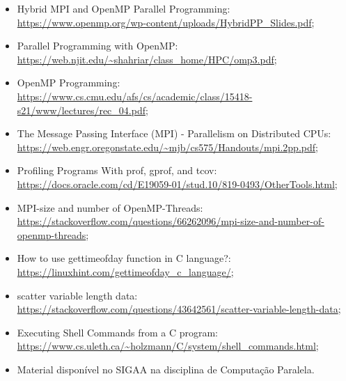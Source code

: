 \documentclass[a4paper, 12pt]{article}
\begin{document}
\begin{itemize}
    \item Hybrid MPI and OpenMP Parallel Programming: \url{https://www.openmp.org/wp-content/uploads/HybridPP_Slides.pdf};
    \item Parallel Programming with OpenMP: \url{https://web.njit.edu/~shahriar/class_home/HPC/omp3.pdf};
    \item OpenMP Programming: \url{https://www.cs.cmu.edu/afs/cs/academic/class/15418-s21/www/lectures/rec_04.pdf};
    \item The Message Passing Interface (MPI) - Parallelism on Distributed CPUs: \url{https://web.engr.oregonstate.edu/~mjb/cs575/Handouts/mpi.2pp.pdf};
    \item Profiling Programs With prof, gprof, and tcov: \url{https://docs.oracle.com/cd/E19059-01/stud.10/819-0493/OtherTools.html};
    \item MPI-size and number of OpenMP-Threads: \url{https://stackoverflow.com/questions/66262096/mpi-size-and-number-of-openmp-threads};
    \item How to use gettimeofday function in C language?: \url{https://linuxhint.com/gettimeofday_c_language/};
    \item scatter variable length data: \url{https://stackoverflow.com/questions/43642561/scatter-variable-length-data};
    \item Executing Shell Commands from a C program: \url{https://www.cs.uleth.ca/~holzmann/C/system/shell_commands.html};
    \item Material disponível no SIGAA na disciplina de Computação Paralela.
\end{itemize}
\end{document}
